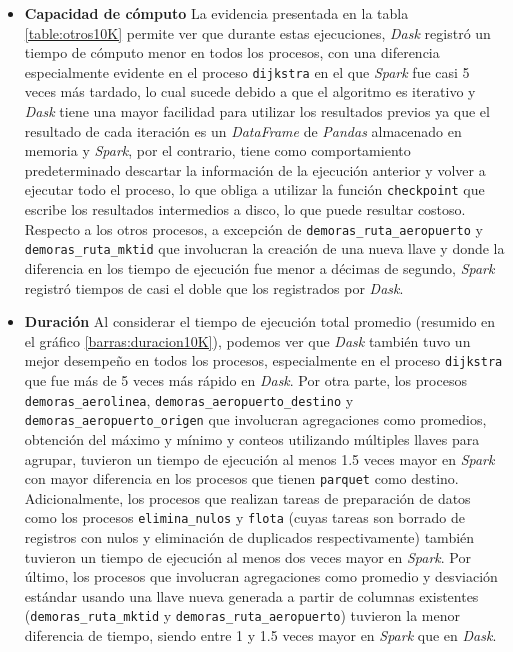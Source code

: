 \begin{itemize}
	\item \textbf{Capacidad de cómputo} La evidencia presentada en la tabla \ref{table:otros10K} permite ver que durante estas ejecuciones, \textit{Dask} registró un tiempo de  cómputo menor en todos los procesos, con una diferencia especialmente evidente en el proceso \texttt{dijkstra} en el que \textit{Spark} fue casi 5 veces más tardado, lo cual sucede debido a que el algoritmo es iterativo y \textit{Dask} tiene una mayor facilidad para utilizar los resultados previos ya que el resultado de cada iteración es un \textit{DataFrame} de \textit{Pandas} almacenado en memoria y \textit{Spark}, por el contrario, tiene como comportamiento predeterminado descartar la información de la ejecución anterior y volver a ejecutar todo el proceso, lo que obliga a utilizar la función \texttt{checkpoint} que escribe los resultados intermedios a disco, lo que puede resultar costoso. Respecto a los otros procesos, a excepción de \texttt{demoras\_ruta\_aeropuerto} y \texttt{demoras\_ruta\_mktid} que involucran la creación de una nueva llave y donde la diferencia en los tiempo de ejecución fue menor a décimas de segundo, \textit{Spark} registró tiempos de casi el doble que los registrados por \textit{Dask}.
	
	\item \textbf{Duración} Al considerar el tiempo de ejecución total promedio (resumido en el gráfico \ref{barras:duracion10K}), podemos ver que \textit{Dask} también tuvo un mejor desempeño en todos los procesos, especialmente en el proceso \texttt{dijkstra} que fue más de 5 veces más rápido en \textit{Dask}. Por otra parte, los procesos \texttt{demoras\_aerolinea}, \texttt{demoras\_aeropuerto\_destino} y \texttt{demoras\_aeropuerto\_origen} que involucran agregaciones como promedios, obtención del máximo y mínimo y conteos utilizando múltiples llaves para agrupar, tuvieron un tiempo de ejecución al menos 1.5 veces mayor en \textit{Spark} con mayor diferencia en los procesos que tienen \texttt{parquet} como destino. Adicionalmente, los procesos que realizan tareas de preparación de datos como los procesos \texttt{elimina\_nulos} y \texttt{flota} (cuyas tareas son borrado de registros con nulos y eliminación de duplicados respectivamente) también tuvieron un tiempo de ejecución al menos dos veces mayor en \textit{Spark}. Por último, los procesos que involucran agregaciones como promedio y desviación estándar usando una llave nueva generada a partir de columnas existentes (\texttt{demoras\_ruta\_mktid} y \texttt{demoras\_ruta\_aeropuerto}) tuvieron la menor diferencia de tiempo, siendo entre 1 y 1.5 veces mayor en \textit{Spark} que en \textit{Dask}.  
	
\end{itemize}


